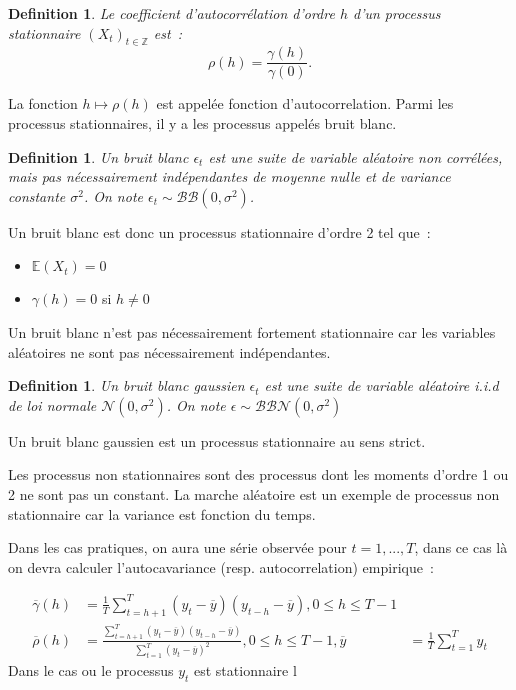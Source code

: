 \documentclass[11pt]{scrartcl} %
\newtheorem{Def}[theorem]{Definition}
\newcommand{\Xt}{\left(X_t\right)_{t\in\mathbb{Z}}}
\newcommand{\E}[1]{\mathbb{E}\left(#1\right)}
\newcommand{\bb}[1]{\mathcal{BB}\left(0,#1\right)}
\newcommand{\bbn}[1]{\mathcal{BBN}\left(0,#1\right)}
\begin{document}
\begin{Def}
Le coefficient d'autocorrélation d'ordre $h$ d'un processus stationnaire $\Xt$ est~:
$$\rho(h)=\frac{\gamma(h)}{\gamma(0)}.$$
\end{Def}
La fonction $h\mapsto\rho(h)$ est appelée fonction d'autocorrelation.
Parmi les processus stationnaires, il y a les processus appelés bruit blanc.
\begin{Def}
Un bruit blanc $\epsilon_t$ est une suite de variable aléatoire non corrélées, mais pas nécessairement indépendantes de moyenne nulle et de variance constante $\sigma^2$. On note $\epsilon_t\sim \bb{\sigma^2}$. 
\end{Def}
Un bruit blanc est donc un processus stationnaire d'ordre 2 tel que~:
\begin{itemize}
\item $\E{X_t}=0$\\
\item $\gamma(h)=0$ si $h\not =0$
\end{itemize}
Un bruit blanc n'est pas nécessairement fortement stationnaire car les variables aléatoires ne sont pas nécessairement indépendantes.
\begin{Def}
Un bruit blanc gaussien $\epsilon_t$ est une suite de variable aléatoire i.i.d de loi normale $\mathcal{N}\left(0,\sigma^2\right)$. On note $\epsilon\sim \bbn{\sigma^2}$
\end{Def}
Un bruit blanc gaussien est un processus stationnaire au sens strict. 


Les processus non stationnaires sont des processus dont les moments d'ordre 1 ou 2 ne sont pas un constant. La marche aléatoire est un exemple de processus non stationnaire car la variance est fonction du temps.

Dans les cas pratiques, on aura une série observée pour $t=1,...,T$, dans ce cas là on devra calculer l'autocavariance (resp. autocorrelation) empirique~:

\begin{align*}
\overline{\gamma}(h)&=\frac{1}{T}\sum_{t=h+1}^T(y_t-\overline{y})(y_{t-h}-\overline{y}), 0\leq h\leq T-1\\
\overline{\rho}(h)&=\frac{\sum_{t=h+1}^T(y_t-\overline{y})(y_{t-h}-\overline{y})}{\sum_{t=1}^T(y_t-\overline{y})^2}, 0\leq h\leq T-1,
\overline{y} &= \frac{1}{T}\sum_{t=1}^Ty_t
\end{align*}
Dans le cas ou le processus $y_t$ est stationnaire l
\end{document}
